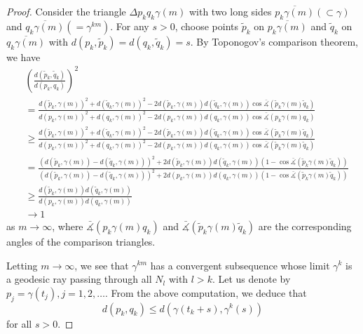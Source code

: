 \begin{proof}
Consider the triangle $\Delta p_{k}q_k\gamma(m)$ with two long
sides $\overline{p_{k}\gamma(m)}(\subset\gamma)$ and
$\overline{q_{k}\gamma(m)}(= \gamma^{km})$. For any $s>0$, choose
points ${\tilde{p}_{k}}$ on $\overline{p_{k}\gamma(m)}$ and
${\tilde{q}_{k}}$ on $\overline{q_{k}\gamma(m)}$ with
$d(p_{k},{\tilde{p}_{k}})=d(q_{k},{\tilde{q}_{k}})=s$. By
Toponogov's comparison theorem, we have {\small
\begin{align*}
&  \left(\frac{d({\tilde{p}_{k}},{\tilde{q}_{k}})}{d(p_{k},q_{k})}\right)^{2}\\
&  =\frac{d({\tilde{p}_{k}},\gamma(m))^{2}
+d({\tilde{q}_{k}},\gamma(m))^{2}-2d({\tilde{p}_{k}},
\gamma(m))d({\tilde{q}_{k}}, \gamma(m))\cos\bar{\measuredangle}
({\tilde{p}_{k}}\gamma(m){\tilde{q}_{k}})}
{d({p_{k}},\gamma(m))^{2}+d({q_{k}},\gamma(m))^{2}-2d({p_{k}},
\gamma(m))d({q_{k}},\gamma(m))\cos\bar{\measuredangle}
({p_{k}}\gamma(m){q_{k}})}\\[1mm]
&  \geq \frac{d({\tilde{p}_{k}},\gamma(m))^{2}+d({\tilde{q}_{k}},
\gamma(m))^{2}-2d({\tilde{p}_{k}},\gamma(m))d({\tilde{q}_{k}},
\gamma(m))\cos\bar{\measuredangle}
({\tilde{p}_{k}}\gamma(m){\tilde{q}_{k}})}
{d({p_{k}},\gamma(m))^{2}+d({q_{k}},\gamma(m))^{2}
-2d({p_{k}},\gamma(m))d({q_{k}},
\gamma(m))\cos\bar{\measuredangle}
({\tilde{p}_{k}}\gamma(m){\tilde{q}_{k}})}\\[1mm]
&  = \frac{(d({\tilde{p}_{k}},\gamma(m)) -
d({\tilde{q}_{k}},\gamma(m)))^{2}+2d({\tilde{p}_{k}},
\gamma(m))d({\tilde{q}_{k}}, \gamma(m))(1 -
\cos\bar{\measuredangle}
({\tilde{p}_{k}}\gamma(m){\tilde{q}_{k}}))}
{(d({\tilde{p}_{k}},\gamma(m)) -
d({\tilde{q}_{k}},\gamma(m)))^{2}+2d({{p}_{k}},\gamma(m))d({{q}_{k}},
\gamma(m))(1 - \cos\bar{\measuredangle}
({\tilde{p}_{k}}\gamma(m){\tilde{q}_{k}}))}\\[1mm]
&  \geq \frac{d({\tilde{p}_{k}},\gamma(m))d({\tilde{q}_{k}},
\gamma(m))} {d({p_{k}},\gamma(m))d({q_{k}}, \gamma(m))}\\[1mm]
&   \rightarrow 1
\end{align*}
} as $m\rightarrow\infty$, where $\bar{\measuredangle}
({{p}_{k}}\gamma(m){{q}_{k}})$ and $\bar{\measuredangle}
({\tilde{p}_{k}}\gamma(m){\tilde{q}_{k}})$ are the corresponding
angles of the comparison triangles.

Letting $m\rightarrow \infty$, we see that $\gamma^{km}$ has a
convergent subsequence whose limit $\gamma^{k}$ is a geodesic ray
passing through all $N_l$ with $l > k$. Let us denote by
$p_{j}=\gamma(t_j), j=1, 2, \ldots$. From the above computation,
we deduce that
$$
d(p_{k},q_{k})\leq d(\gamma(t_k+s),\gamma^{k}(s))
$$
for all $s>0$.


\end{proof}
